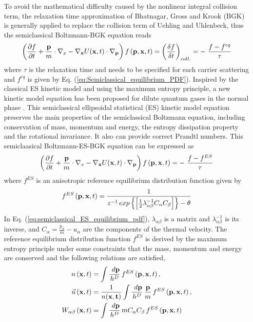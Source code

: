 \documentclass{rsproca}%
\begin{document}
To avoid the mathematical difficulty caused by the nonlinear integral collision term, the relaxation time approximation of Bhatnagar, Gross and Krook (BGK) is generally applied to replace the collision term of Uehling and Uhlenbeck, thus the semiclassical Boltzmann-BGK equation reads
\begin{equation}
\left(\frac{\partial f}{\partial t}+\frac{\bf p}{m}\cdot {\bf\nabla }_x-{\bf \nabla}_{\bf x} U({\bf x},t)\cdot {\bf\nabla }_{\bf p}\right)f\left({\bf p},{\bf x},t\right) =\left(\frac{\delta f}{\delta t}\right)_{coll.}= -\ \frac{f-f^{eq}}{\tau }
\end{equation}
where $\tau$ is the relaxation time and needs to be specified for each carrier scattering and $f^{eq}$ is given by Eq. (\ref{eq:Semiclassical_equilibrium_PDF}). Inspired by the classical ES kinetic model \cite{Holway1966} and using the maximum entropy principle, a new kinetic model equation has been proposed for dilute quantum gases in the normal phase \cite{Wu2012}.  This semiclassical ellipsoidal statistical (ES) kinetic model equation preserves the main properties of the semiclassical Boltzmann equation, including conservation of mass, momentum and energy, the entropy dissipation property and the rotational invariance.   It also can provide correct Prandtl numbers.   This semiclaasical Boltzmann-ES-BGK equation can be expressed as
\begin{equation}
\left(\frac{\partial f}{\partial t}+\frac{\bf p}{m}\cdot {\bf\nabla }_x-{\bf \nabla}_{\bf x} U({\bf x},t)\cdot {\bf\nabla }_{\bf p}\right)f\left({\bf p},{\bf x},t\right) = -\ \frac{f-f^{ES}}{\tau }
\label{eq:semiclassical_B_ESBGK}
\end{equation}
where $f^{ES}$ is an anisotropic reference equilibrium distribution function given by
\begin{equation}
f^{ES}\left({\bf p},{\bf x},t\right) =\frac{1}{z^{-1}\,exp\left\{{\left[ \frac{1}{2} \lambda_{\alpha \beta}^{-1} C_{\alpha} C_{\beta} \right]} \right\} -\theta }
\label{eq:semiclassical_ES_equilibrium_pdf}
\end{equation}
In Eq. (\ref{eq:semiclassical_ES_equilibrium_pdf}), $\lambda_{\alpha \beta}$ is a matrix and $\lambda_{\alpha \beta}^{-1}$ is its inverse, and $C_{\alpha} = \frac{p_{\alpha}}{m} - u_{\alpha}$ are the components of the thermal velocity.
The reference equilibrium distribution function $f^{ES}$ is derived by the maximum entropy principle under some constraints that the mass, momentum and energy are conserved and the following relations are satisfied,
\begin{subequations}
\begin{align}
n\left({\bf x},t\right) &= \int{\frac{\ d{\bf p}}{h^D}}\,f^{ES} \left({\bf p},{\bf x}, t\right), \\
\vec u \left({\bf x},t\right) &= \frac{1}{n(\bf x, t)}\int{\frac{\ d{\bf p}}{h^D}\,\frac{\bf p}{m}}\,f^{ES}\left({\bf p},{\bf x}, t\right), \\
W_{\alpha \beta} \left({\bf x},t\right) &= \int{\frac{\ d{\bf p}}{h^D}\,m C_{\alpha} C_{\beta} \,f^{ES} \left({\bf p},{\bf x}, t\right)}
\end{align}
\end{subequations}
\end{document}
